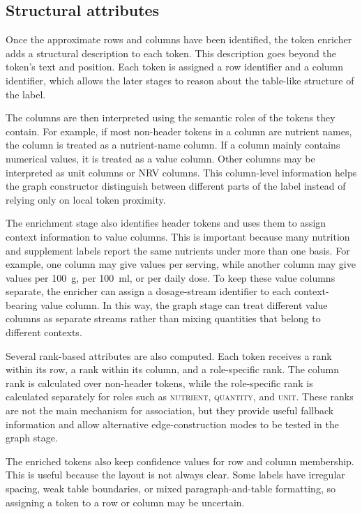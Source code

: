 \subsection{Structural attributes}\label{sec:enrichment-structure}

Once the approximate rows and columns have been identified, the token enricher adds a structural description to each token. This description goes beyond the token's text and position. Each token is assigned a row identifier and a column identifier, which allows the later stages to reason about the table-like structure of the label.

The columns are then interpreted using the semantic roles of the tokens they contain. For example, if most non-header tokens in a column are nutrient names, the column is treated as a nutrient-name column. If a column mainly contains numerical values, it is treated as a value column. Other columns may be interpreted as unit columns or NRV columns. This column-level information helps the graph constructor distinguish between different parts of the label instead of relying only on local token proximity.

The enrichment stage also identifies header tokens and uses them to assign context information to value columns. This is important because many nutrition and supplement labels report the same nutrients under more than one basis. For example, one column may give values per serving, while another column may give values per 100~g, per 100~ml, or per daily dose. To keep these value columns separate, the enricher can assign a dosage-stream identifier to each context-bearing value column. In this way, the graph stage can treat different value columns as separate streams rather than mixing quantities that belong to different contexts.

Several rank-based attributes are also computed. Each token receives a rank within its row, a rank within its column, and a role-specific rank. The column rank is calculated over non-header tokens, while the role-specific rank is calculated separately for roles such as \textsc{nutrient}, \textsc{quantity}, and \textsc{unit}. These ranks are not the main mechanism for association, but they provide useful fallback information and allow alternative edge-construction modes to be tested in the graph stage.

The enriched tokens also keep confidence values for row and column membership. This is useful because the layout is not always clear. Some labels have irregular spacing, weak table boundaries, or mixed paragraph-and-table formatting, so assigning a token to a row or column may be uncertain.

